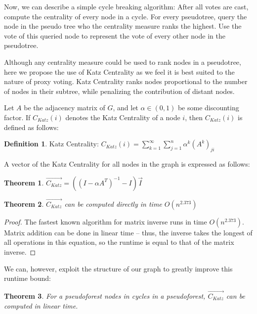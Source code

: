 \documentclass[10pt]{article}
\newtheorem{theorem}{Theorem}[section]
\theoremstyle{definition}
\newtheorem{definition}{Definition}[section]
\begin{document}
Now, we can describe a simple cycle breaking algorithm: After all votes are cast, compute the centrality of every node in a cycle. For every pseudotree, query the node in the pseudo tree who the centrality measure ranks the highest. Use the vote of this queried node to represent the vote of every other node in the pseudotree.

Although any centrality measure could be used to rank nodes in a pseudotree, here we propose the use of Katz Centrality as we feel it is best suited to the nature of proxy voting. Katz Centrality ranks nodes proportional to the number of nodes in their subtree, while penalizing the contribution of distant nodes.

Let $A$ be the adjacency matrix of $G$, and let $\alpha \in (0,1)$ be some discounting factor. If $C_{Katz}(i)$ denotes the Katz Centrality of a node $i$, then $C_{Katz}(i)$ is defined as follows:
\theoremstyle{definition}
\begin{definition}{Katz Centrality:}
$C_{Katz}(i) = \sum\limits_{k=1}^{\infty}\sum\limits_{j=1}^n\alpha^k(A^k)_{ji}$
\end{definition}

A vector of the Katz Centrality for all nodes in the graph is expressed as follows:

\begin{theorem}
$\overrightarrow{C_{Katz}}  = ((I - \alpha A^T)^{-1}-I)\vec{I}$
\end{theorem}

\begin{theorem}
$\overrightarrow{C_{Katz}}$ can be computed directly in time $O(n^{2.373})$
\end{theorem}
\begin{proof}
The fastest known algorithm for matrix inverse runs in time $O(n^2.373)$. Matrix addition can be done in linear time -- thus, the inverse takes the longest of all operations in this equation, so the runtime is equal to that of the matrix inverse.
\end{proof}

We can, however, exploit the structure of our graph to greatly improve this runtime bound:

\begin{theorem}
For a pseudoforest nodes in cycles in a pseudoforest, $\overrightarrow{C_{Katz}}$ can be computed in linear time.
\end{theorem}
\end{document}
